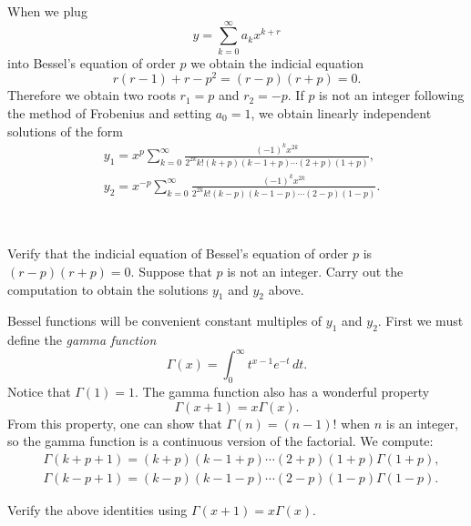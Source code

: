 When we plug
\begin{equation*}
y = \sum_{k=0}^\infty a_k x^{k+r}
\end{equation*}
into Bessel's equation of order $p$ we obtain the indicial equation
\begin{equation*}
r(r-1)+r-p^2 = (r-p)(r+p) = 0 .
\end{equation*}
Therefore we obtain two roots $r_1 = p$ and $r_2 = -p$.
If $p$ is not an integer following the method of Frobenius and
setting $a_0 = 1$, we obtain
linearly independent solutions of the form
\begin{align*}
& y_1 = x^p \sum_{k=0}^\infty
\frac{{(-1)}^k x^{2k}}{2^{2k} k! (k+p)(k-1+p)\cdots (2+p)(1+p)} ,
\\
& y_2 = x^{-p} \sum_{k=0}^\infty
\frac{{(-1)}^k x^{2k}}{2^{2k} k! (k-p)(k-1-p)\cdots (2-p)(1-p)} .
\end{align*}

\begin{exercise}
{\ }
\begin{tasks}
\task
Verify that the indicial equation of Bessel's equation of order $p$ is
$(r-p)(r+p)=0$.
\task
Suppose that $p$ is not an integer.  Carry out the computation
to obtain the solutions $y_1$ and $y_2$ above.
\end{tasks}
\end{exercise}

Bessel functions will be convenient constant multiples of $y_1$ and $y_2$.
First we must define the \emph{gamma function}
\begin{equation*}
\Gamma(x) = \int_0^\infty t^{x-1} e^{-t} \, dt .
\end{equation*}
Notice that $\Gamma(1) = 1$.
The gamma function also has a wonderful property
\begin{equation*}
\Gamma(x+1) = x \Gamma(x) .
\end{equation*}
From this property, one can show that $\Gamma(n) = (n-1)!$ when $n$ is an
integer, so the gamma function is a continuous version of the factorial.  We
compute:
\begin{align*}
& \Gamma(k+p+1)=(k+p)(k-1+p)\cdots (2+p)(1+p) \Gamma(1+p) ,
\\
& \Gamma(k-p+1)=(k-p)(k-1-p)\cdots (2-p)(1-p) \Gamma(1-p) .
\end{align*}

\begin{exercise}
Verify the above identities using 
$\Gamma(x+1) = x \Gamma(x)$.
\end{exercise}

